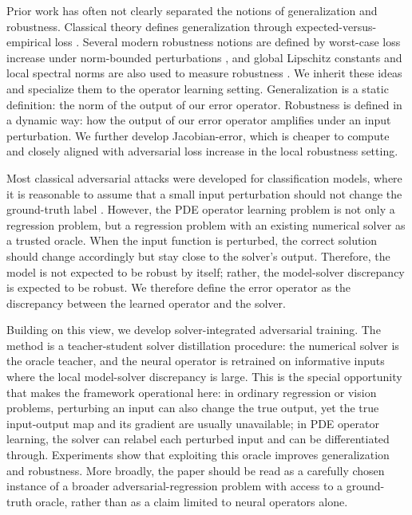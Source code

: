 \documentclass{article}
\begin{document}
Prior work has often not clearly separated the notions of generalization and
robustness.
Classical theory defines generalization through expected-versus-empirical loss
\citep{bousquet2002stability,xu2012robustness}. Several modern robustness
notions are defined by worst-case loss increase under norm-bounded
perturbations \citep{madry2018towards}, and global Lipschitz constants and
local spectral norms are also used to measure robustness
\citep{cisse2017parseval,huang2026stablepdenet}. We inherit these ideas and
specialize them to the operator learning setting. Generalization is a static
definition: the norm of the output of our error operator. Robustness is defined
in a dynamic way: how the output of our error operator amplifies under an input
perturbation. We further develop Jacobian-error, which is cheaper to
compute and closely aligned with adversarial loss increase in the local
robustness setting.

Most classical adversarial attacks were developed for classification models, where it
is reasonable to assume that a small input perturbation should not change the
ground-truth label \citep{goodfellow2015explaining,madry2018towards}. However,
the PDE operator learning problem is not only a regression problem, but a
regression problem with an existing numerical solver as a trusted oracle. When
the input function is perturbed, the correct solution should change accordingly
but stay close to the solver's output. Therefore, the model is not expected to
be robust by itself; rather, the model-solver discrepancy is expected to be
robust. We therefore define the error operator as the discrepancy between the
learned operator and the solver.

Building on this view, we develop solver-integrated adversarial training. The
method is a teacher-student solver distillation procedure: the numerical solver
is the oracle teacher, and the neural operator is retrained on informative
inputs where the local model-solver discrepancy is large. This is the special
opportunity that makes the framework operational here: in ordinary regression or
vision problems, perturbing an input can also change the true output, yet the
true input-output map and its gradient are usually unavailable; in PDE operator
learning, the solver can relabel each perturbed input and can be differentiated
through. Experiments show that exploiting this oracle improves generalization
and robustness. More broadly, the paper should be read as a carefully chosen
instance of a broader adversarial-regression problem with access to a
ground-truth oracle, rather than as a claim limited to neural operators alone.
\end{document}
